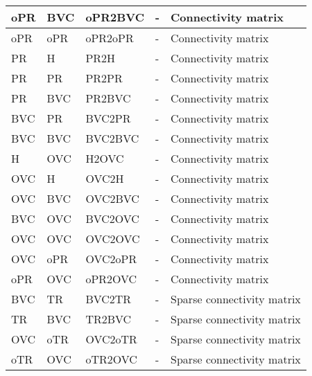 \documentclass{article}
\begin{document}
\begin{xltabular}{\linewidth}{|l|l|l|X|X|}
    oPR & BVC & oPR2BVC & - &
    Connectivity matrix \\ \hline

    oPR & oPR & oPR2oPR & - &
    Connectivity matrix \\ \hline

    PR & H & PR2H & - &
    Connectivity matrix \\ \hline

    PR & PR & PR2PR & - &
    Connectivity matrix \\ \hline

    PR & BVC & PR2BVC & - &
    Connectivity matrix \\ \hline

    BVC & PR & BVC2PR & - &
    Connectivity matrix \\ \hline

    BVC & BVC & BVC2BVC & - &
    Connectivity matrix \\ \hline

    H & OVC & H2OVC & - &
    Connectivity matrix \\ \hline

    OVC & H & OVC2H & - &
    Connectivity matrix \\ \hline

    OVC & BVC & OVC2BVC & - &
    Connectivity matrix \\ \hline

    BVC & OVC & BVC2OVC & - &
    Connectivity matrix \\ \hline

    OVC & OVC & OVC2OVC & - &
    Connectivity matrix \\ \hline

    OVC & oPR & OVC2oPR & - &
    Connectivity matrix \\ \hline

    oPR & OVC & oPR2OVC & - &
    Connectivity matrix \\ \hline

    BVC & TR & BVC2TR & - &
    Sparse connectivity matrix \\ \hline

    TR & BVC & TR2BVC & - &
    Sparse connectivity matrix \\ \hline

    OVC & oTR & OVC2oTR & - &
    Sparse connectivity matrix \\ \hline

    oTR & OVC & oTR2OVC & - &
    Sparse connectivity matrix \\ \hline


\end{xltabular}
\end{document}
